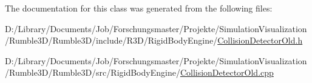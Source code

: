 The documentation for this class was generated from the following files\+:\begin{DoxyCompactItemize}
\item 
D\+:/\+Library/\+Documents/\+Job/\+Forschungsmaster/\+Projekte/\+Simulation\+Visualization/\+Rumble3\+D/\+Rumble3\+D/include/\+R3\+D/\+Rigid\+Body\+Engine/\mbox{\hyperlink{_collision_detector_old_8h}{Collision\+Detector\+Old.\+h}}\item 
D\+:/\+Library/\+Documents/\+Job/\+Forschungsmaster/\+Projekte/\+Simulation\+Visualization/\+Rumble3\+D/\+Rumble3\+D/src/\+Rigid\+Body\+Engine/\mbox{\hyperlink{_collision_detector_old_8cpp}{Collision\+Detector\+Old.\+cpp}}\end{DoxyCompactItemize}
